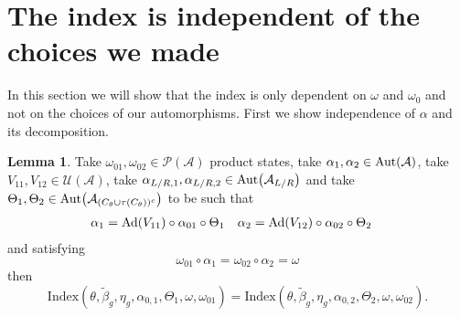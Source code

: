 \documentclass[12pt,a4paper,twoside]{article}
\let\originalleft\left
\let\originalright\right
\renewcommand{\left}{\mathopen{}\mathclose\bgroup\originalleft}
\renewcommand{\right}{\aftergroup\egroup\originalright}
\newcommand{\UU}{\mathcal U}
\newcommand{\PP}{\mathcal P}
\renewcommand{\AA}{\mathcal A}
\newcommand{\Ad}[1]{\textrm{Ad}\left(#1\right)}
\newcommand{\Aut}[1]{\textrm{Aut}\left(#1\right)}
\theoremstyle{definition}
\newtheorem{lemma}[theorem]{Lemma}
\numberwithin{equation}{section}
\begin{document}
\section{The index is independent of the choices we made}
In this section we will show that the index is only dependent on $\omega$ and $\omega_0$ and not on the choices of our automorphisms. First we show independence of $\alpha$ and its decomposition.
\begin{lemma}
	Take $\omega_{01},\omega_{02}\in\PP(\AA)$ product states, take $\alpha_1,\alpha_2\in\Aut{\AA}$, take $V_{11},V_{12}\in\UU(\AA)$, take $\alpha_{L/R,1},\alpha_{L/R,2}\in\Aut{\AA_{L/R}}$ and take $\Theta_1,\Theta_2\in \Aut{\AA_{(C_\theta\cup \tau(C_\theta))^c}}$ to be such that
	\begin{align}
		\alpha_1&=\Ad{V_{11}}\circ\alpha_{01}\circ\Theta_1&\alpha_2&=\Ad{V_{12}}\circ\alpha_{02}\circ \Theta_2
	\end{align}
	and satisfying
	\begin{equation}
		\omega_{01}\circ\alpha_1=\omega_{02}\circ\alpha_2=\omega
	\end{equation}
	then
	\begin{equation}
		\textrm{Index}(\theta,\tilde{\beta}_g,\eta_g,\alpha_{0,1},\Theta_1,\omega,\omega_{01})=\textrm{Index}(\theta,\tilde{\beta}_g,\eta_g,\alpha_{0,2},\Theta_2,\omega,\omega_{02}).
	\end{equation}
\end{lemma}
\end{document}

